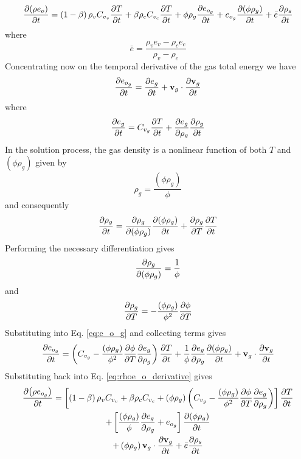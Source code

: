 \begin{equation}
  {\frac{\partial{\left(\rho e_{o} \right)}}{\partial{t}}} = \left(1-\beta\right)\rho_{v}C_{v_{v}}{\frac{\partial{T}}{\partial{t}}} + \beta\rho_{c}C_{v_{c}}{\frac{\partial{T}}{\partial{t}}} + \phi\rho_{g}{\frac{\partial{e_{o_{g}}}}{\partial{t}}} + e_{o_{g}}{\frac{\partial{\left(\phi\rho_{g}\right)}}{\partial{t}}}+ \bar{e}{\frac{\partial{\rho_{s}}}{\partial{t}}}
  \label{eq:rhoe_o_derivative}
\end{equation}
where
\begin{equation}
  \bar{e} = \frac{\rho_{v}e_{v}-\rho_{c}e_{c}}{\rho_{v}-\rho_{c}}
\end{equation}
Concentrating now on the temporal derivative of the gas total energy we have
\begin{equation}
  {\frac{\partial{e_{o_{g}}}}{\partial{t}}} = {\frac{\partial{e_{g}}}{\partial{t}}} + \mathbf{v}_{g} \cdot {\frac{\partial{\mathbf{v}_{g}}}{\partial{t}}}
  \label{eq:e_o_g}
\end{equation}
where
\begin{equation}
  {\frac{\partial{e_{g}}}{\partial{t}}} = C_{v_{g}}{\frac{\partial{T}}{\partial{t}}} + {\frac{\partial{e_{g}}}{\partial{\rho_{g}}}} {\frac{\partial{\rho_{g}}}{\partial{t}}}
\end{equation}
In the solution process, the gas density is a nonlinear function of both $T$ and $\left(\phi\rho_{g}\right)$ given by
\begin{equation}
  \rho_{g} = \frac{\left(\phi\rho_{g}\right)}{\phi}
\end{equation}
and consequently
\begin{equation}
  {\frac{\partial{\rho_{g}}}{\partial{t}}} = {\frac{\partial{\rho_{g}}}{\partial{\left(\phi\rho_{g}\right)}}} {\frac{\partial{\left(\phi\rho_{g}\right)}}{\partial{t}}} + {\frac{\partial{\rho_{g}}}{\partial{T}}}{\frac{\partial{T}}{\partial{t}}}
\end{equation}
Performing the necessary differentiation gives
\begin{equation}
  {\frac{\partial{\rho_{g}}}{\partial{\left(\phi\rho_{g}\right)}}} = \frac{1}{\phi}
\end{equation}
and
\begin{equation}
  {\frac{\partial{\rho_{g}}}{\partial{T}}} = -\frac{\left(\phi\rho_{g}\right)}{\phi^{2}}{\frac{\partial{\phi}}{\partial{T}}}
\end{equation}
Substituting into Eq. \ref{eq:e_o_g} and collecting terms gives
\begin{equation}
  {\frac{\partial{e_{o_{g}}}}{\partial{t}}} = \left(C_{v_{g}} -  \frac{\left(\phi\rho_{g}\right)}{\phi^{2}}{\frac{\partial{\phi}}{\partial{T}}}{\frac{\partial{e_{g}}}{\partial{\rho_{g}}}}\right){\frac{\partial{T}}{\partial{t}}} + \frac{1}{\phi}{\frac{\partial{e_{g}}}{\partial{\rho_{g}}}}{\frac{\partial{\left(\phi\rho_{g}\right)}}{\partial{t}}} + \mathbf{v}_{g} \cdot {\frac{\partial{\mathbf{v}_{g}}}{\partial{t}}}
\end{equation}
Substituting back into Eq. \ref{eq:rhoe_o_derivative} gives
\begin{multline}
  {\frac{\partial{\left(\rho e_{o_{g}}\right)}}{\partial{t}}} = \left[\left(1-\beta\right)\rho_{v}C_{v_{v}} + \beta\rho_{c}C_{v_{c}} + \left(\phi\rho_{g}\right)\left( C_{v_{g}} -  \frac{\left(\phi\rho_{g}\right)}{\phi^{2}}{\frac{\partial{\phi}}{\partial{T}}}{\frac{\partial{e_{g}}}{\partial{\rho_{g}}}}\right) \right]{\frac{\partial{T}}{\partial{t}}} 
\\ + \left[\frac{\left(\phi\rho_{g}\right)}{\phi}{\frac{\partial{e_{g}}}{\partial{\rho_{g}}}} + e_{o_{g}} \right]{\frac{\partial{\left(\phi\rho_{g}\right)}}{\partial{t}}} 
\\ + \left(\phi\rho_{g}\right) \mathbf{v}_{g} \cdot {\frac{\partial{\mathbf{v}_{g}}}{\partial{t}}} + \bar{e}{\frac{\partial{\rho_{s}}}{\partial{t}}}
\end{multline}
